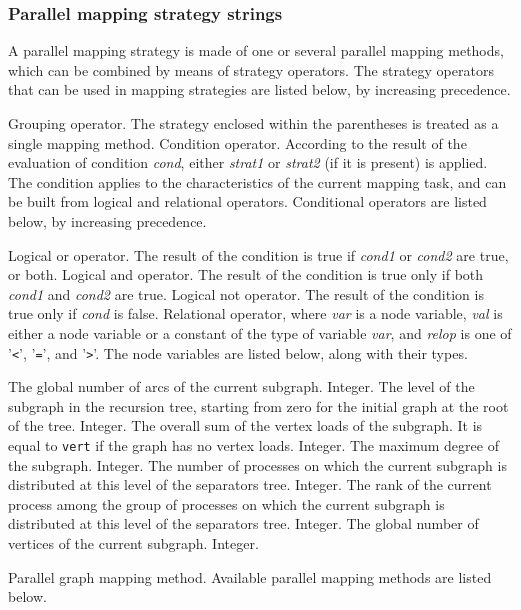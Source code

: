 \subsubsection{Parallel mapping strategy strings}
\label{sec-lib-format-strat-pmap}

A parallel mapping strategy is made of one or several parallel
mapping methods, which can be combined by means of strategy
operators. The strategy operators that can be used in mapping
strategies are listed below, by increasing precedence.
\begin{itemize}
\iteme[{\tt (}{\it strat\/}{\tt )}]
Grouping operator.
The strategy enclosed within the parentheses is treated as a single
mapping method.
Condition operator. According to the result of the evaluation of
condition {\it cond}, either {\it strat1\/} or {\it strat2\/} (if it
is present) is applied. The condition applies to the characteristics
of the current mapping task, and can be built from logical and
relational operators. Conditional operators are listed below, by
increasing precedence.
\begin{itemize}
Logical or operator. The result of the condition is true if {\it cond1\/}
or {\it cond2\/} are true, or both.
Logical and operator. The result of the condition is true only if both
{\it cond1\/} and {\it cond2\/} are true.
\iteme[{\tt !}{\it cond}]
Logical not operator. The result of the condition is true only if
{\it cond\/} is false.
Relational operator, where {\it var\/} is a node variable, {\it val\/} is
either a node variable or a constant of the type of variable {\it var}, and
{\it relop\/} is one of '{\tt\verb+<+}', '{\tt\verb+=+}', and '{\tt\verb+>+}'.
The node variables are listed below, along with their types.
\begin{itemize}
\iteme[{\tt edge}]
The global number of arcs of the current subgraph.
Integer.
\iteme[{\tt levl}]
The level of the subgraph in the recursion tree, starting from zero
for the initial graph at the root of the tree.
Integer.
\iteme[{\tt load}]
The overall sum of the vertex loads of the subgraph. It is equal to
{\tt vert} if the graph has no vertex loads.
Integer.
\iteme[{\tt mdeg}]
The maximum degree of the subgraph.
Integer.
\iteme[{\tt proc}]
The number of processes on which the current subgraph is distributed
at this level of the separators tree.
Integer.
\iteme[{\tt rank}]
The rank of the current process among the group of processes on
which the current subgraph is distributed at this level of the
separators tree.
Integer.
\iteme[{\tt vert}]
The global number of vertices of the current subgraph.
Integer.
\end{itemize}
\end{itemize}
\iteme[{\it method\/}{[{\tt \{}{\it parameters\/}{\tt \}}]}]
Parallel graph mapping method. Available parallel mapping methods
are listed below.
\end{itemize}
